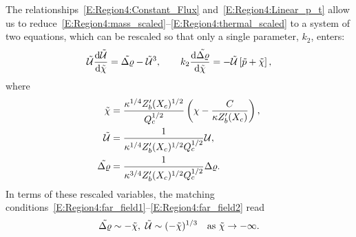 \documentclass{article}
\begin{document}
The relationships~\eqref{E:Region4:Constant_Flux} and~\eqref{E:Region4:Linear_p_t} allow us to reduce~\eqref{E:Region4:mass_scaled}--\eqref{E:Region4:thermal_scaled} to a system of two equations, which can be rescaled so that only a single parameter, $k_2$, enters:
\begin{equation}\label{E:Region4:rescaled}
\tilde{\mathcal{U}} \frac{\mathrm{d} \tilde{\mathcal{U}}}{\mathrm{d} \tilde{\chi}} = \tilde{\Delta \varrho} - \tilde{\mathcal{U}}^3, \qquad 
k_2  \frac{\mathrm{d} \tilde{\Delta \varrho}}{\mathrm{d} \tilde{\chi}} = -\tilde{\mathcal{U}}\left[\tilde{p} + \tilde{\chi}\right],
\end{equation}
where
\begin{align}
\tilde{\chi} &= \frac{\kappa^{1/4}Z_b'(X_c)^{1/2}}{Q_c^{1/2}}\left(\chi - \frac{C}{\kappa Z_b'(X_c)}\right), \label{E:Region4:RescalingChi} \\ 
\tilde{\mathcal{U}} &= \frac{1}{\kappa^{1/4}Z_b'(X_c)^{1/2}Q_c^{1/2}}\mathcal{U}, \label{E:Region4:RescalingU}\\ 
\tilde{\Delta \varrho}&= \frac{1}{\kappa^{3/4}Z_b'(X_c)^{ 1/2}Q_c^{1/2}}\Delta \varrho. \label{E:Region4:RescalingP}
\end{align} 
In terms of these rescaled variables, the matching conditions~\eqref{E:Region4:far_field1}--\eqref{E:Region4:far_field2} read
\begin{equation}\label{E:Region4:Rescaled_farfield}
\tilde{\Delta \varrho} \sim -\tilde{\chi},~ \tilde{\mathcal{U}}\sim (-\tilde{\chi})^{1/3}\quad \text{as}~\tilde{\chi}\to -\infty.
\end{equation}
\end{document}
